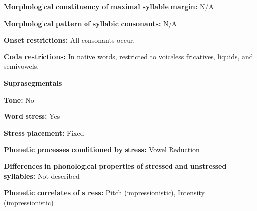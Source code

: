 \documentclass[output=paper]{langsci/langscibook}
\begin{document}
\begin{styleBody}
\textbf{Morphological} \textbf{constituency} \textbf{of} \textbf{maximal} \textbf{syllable} \textbf{margin:} N/A
\end{styleBody}

\begin{styleBody}
\textbf{Morphological} \textbf{pattern} \textbf{of} \textbf{syllabic} \textbf{consonants:} N/A
\end{styleBody}

\begin{styleBody}
\textbf{Onset} \textbf{restrictions:} All consonants occur.
\end{styleBody}

\begin{styleBody}
\textbf{Coda} \textbf{restrictions:} In native words, restricted to voiceless fricatives, liquids, and semivowels.
\end{styleBody}

\begin{styleBody}
\textbf{Suprasegmentals}
\end{styleBody}

\begin{styleBody}
\textbf{Tone:} No
\end{styleBody}

\begin{styleBody}
\textbf{Word} \textbf{stress:} Yes
\end{styleBody}

\begin{styleBody}
\textbf{Stress} \textbf{placement:} Fixed
\end{styleBody}

\begin{styleBody}
\textbf{Phonetic} \textbf{processes} \textbf{conditioned} \textbf{by} \textbf{stress:} Vowel Reduction
\end{styleBody}

\begin{styleBody}
\textbf{Differences} \textbf{in} \textbf{phonological} \textbf{properties} \textbf{of} \textbf{stressed} \textbf{and} \textbf{unstressed} \textbf{syllables:} Not described
\end{styleBody}

\begin{styleBody}
\textbf{Phonetic} \textbf{correlates} \textbf{of} \textbf{stress:} Pitch (impressionistic), Intensity (impressionistic)
\end{styleBody}
\end{document}
